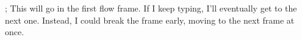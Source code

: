 \documentclass[a4paper]{article}
\begin{document}
;
\clearpage
This will go in the first flow frame.
If I keep typing, I'll eventually get to the next one.
Instead, I could\newpage
break the frame early, moving to the next frame at once.
\end{document}

